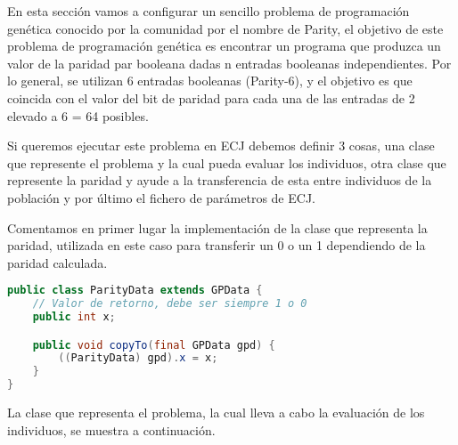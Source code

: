 En esta sección vamos a configurar un sencillo problema de programación genética conocido por la comunidad por el nombre de Parity, el objetivo de este problema de programación genética es encontrar un programa que produzca un valor de la paridad par booleana dadas n entradas booleanas independientes. Por lo general, se utilizan 6 entradas booleanas (Parity-6), y el objetivo es que coincida con el valor del bit de paridad para cada una de las entradas de 2 elevado a 6 = 64 posibles.

Si queremos ejecutar este problema en ECJ debemos definir 3 cosas, una clase que represente el problema y la cual pueda evaluar los individuos, otra clase que represente la paridad y ayude a la transferencia de esta entre individuos de la población y por \'ultimo el fichero de par\'ametros de ECJ.

Comentamos en primer lugar la implementación de la clase que representa la paridad, utilizada en este caso para transferir un 0 o un 1 dependiendo de la paridad calculada.

\begin{lstlisting}[language=Java]
public class ParityData extends GPData {
	// Valor de retorno, debe ser siempre 1 o 0
	public int x;

	public void copyTo(final GPData gpd) {
		((ParityData) gpd).x = x;
	}
}
\end{lstlisting}

La clase que representa el problema, la cual lleva a cabo la evaluaci\'on de los individuos, se muestra a continuación.

